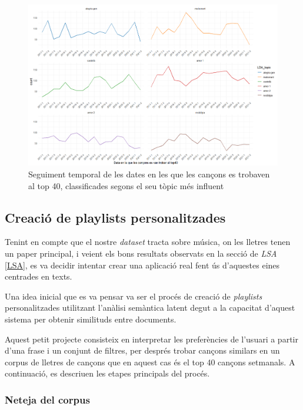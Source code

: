 \begin{figure}[H]
    \centering
    \includegraphics[width=0.98\linewidth]{Images/8_Textual/LDA/topics_temporal_setmana.png}
    \caption{Seguiment temporal de les dates en les que les cançons es trobaven al top 40, classificades segons el seu tòpic més influent}
    \label{fig:LDA:topics_temporal_setmana}
\end{figure}








\subsection{Creació de playlists personalitzades}

Tenint en compte que el nostre \textit{dataset} tracta sobre música, on les lletres tenen un paper principal, i veient els bons resultats observats en la secció de \textit{LSA} \ref{LSA}, es va decidir intentar crear una aplicació real fent ús d'aquestes eines centrades en texts. 

Una idea inicial que es va pensar va ser el procés de creació de \textit{playlists} personalitzades utilitzant l'anàlisi semàntica latent degut a la capacitat d'aquest sistema per obtenir similituds entre documents.

Aquest petit projecte consisteix en interpretar les preferències de l'usuari a partir d'una frase i un conjunt de filtres, per després trobar cançons similars en un corpus de lletres de cançons que en aquest cas és el top 40 cançons setmanals. A continuació, es descriuen les etapes principals del procés.

\subsubsection{Neteja del corpus}

